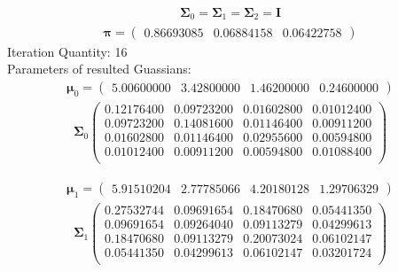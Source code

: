 \documentclass[11pt,a4paper]{article}
\newcommand{\htab}{\hspace*{0.63cm}}
\newcommand{\bs}[1]{\boldsymbol{#1}}
\begin{document}
\begin{align} 
    \bs{\Sigma}_{0} = \bs{\Sigma}_{1} = \bs{\Sigma}_{2} = \bs{I}
\end{align} \vspace{-1cm}
\begin{align}  \bs{\pi} = \begin{pmatrix}
    0.86693085 & 0.06884158 & 0.06422758
\end{pmatrix} \end{align}
\htab Iteration Quantity: 16 \\
\htab Parameters of resulted Guassians:
\begin{align} \bs{\mu}_{0} = \begin{pmatrix} 
5.00600000 & 3.42800000 & 1.46200000 & 0.24600000 
 \end{pmatrix}  \end{align}\vspace{-1cm} 
\begin{align} \bs{\Sigma}_{0}\begin{pmatrix} 
0.12176400 & 0.09723200 & 0.01602800 & 0.01012400 \\ 
0.09723200 & 0.14081600 & 0.01146400 & 0.00911200 \\ 
0.01602800 & 0.01146400 & 0.02955600 & 0.00594800 \\ 
0.01012400 & 0.00911200 & 0.00594800 & 0.01088400 \\ 
\end{pmatrix} \end{align}

\begin{align} \bs{\mu}_{1} = \begin{pmatrix} 
5.91510204 & 2.77785066 & 4.20180128 & 1.29706329 
 \end{pmatrix}  \end{align}\vspace{-1cm} 
\begin{align} \bs{\Sigma}_{1}\begin{pmatrix} 
0.27532744 & 0.09691654 & 0.18470680 & 0.05441350 \\ 
0.09691654 & 0.09264040 & 0.09113279 & 0.04299613 \\ 
0.18470680 & 0.09113279 & 0.20073024 & 0.06102147 \\ 
0.05441350 & 0.04299613 & 0.06102147 & 0.03201724 \\ 
\end{pmatrix} \end{align}
\end{document}
